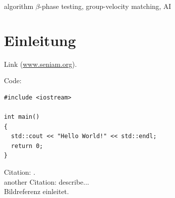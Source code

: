 %
%
%
%
%
%

\begin{abstract}
1st File
\end{abstract}
\begin{keywords}
algorithm $\beta$-phase testing, group-velocity matching, AI
\end{keywords}
\section{Einleitung} \label{sec:Introduction}%

Link (\url{www.seniam.org}).

Code:

\begin{lstlisting}[label={list:first},caption=Sample code.]
#include <iostream>
 
int main()
{
  std::cout << "Hello World!" << std::endl;
  return 0;
}
\end{lstlisting}

Citation: \citep{lohse_how_2010}. \\
another Citation: \cite{smeets_throwing_2002} describe...\\
Bildreferenz  einleitet. 


